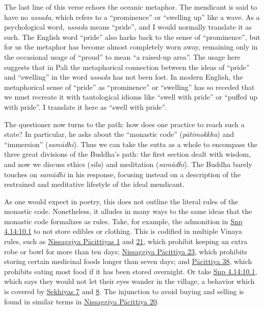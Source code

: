 \documentclass[12pt,openany]{book}%
\begin{document}
The last line of this verse echoes the oceanic metaphor. The mendicant is said to have no \textit{ussada}, which refers to a “prominence” or “swelling up” like a wave. As a psychological word, \textit{ussada} means “pride”, and I would normally translate it as such. The English word “pride” also harks back to the sense of “prominence”, but for us the metaphor has become almost completely worn away, remaining only in the occasional usage of “proud” to mean “a raised-up area”. The usage here suggests that in Pali the metaphorical connection between the ideas of “pride” and “swelling” in the word \textit{ussada} has not been lost. In modern English, the metaphorical sense of “pride” as “prominence” or “swelling” has so receded that we must recreate it with tautological idioms like “swell with pride” or “puffed up with pride”. I translate it here as “swell with pride”.

The questioner now turns to the path: how does one practice to reach such a state? In particular, he asks about the “monastic code” (\textit{\textsanskrit{pātimokkha}}) and “immersion” (\textit{\textsanskrit{samādhi}}). Thus we can take the sutta as a whole to encompass the three great divisions of the Buddha’s path: the first section dealt with wisdom, and now we discuss ethics (\textit{\textsanskrit{sīla}}) and meditation (\textit{\textsanskrit{samādhi}}). The Buddha barely touches on \textit{\textsanskrit{samādhi}} in his response, focusing instead on a description of the restrained and meditative lifestyle of the ideal mendicant.

As one would expect in poetry, this does not outline the literal rules of the monastic code. Nonetheless, it alludes in many ways to the same ideas that the monastic code formalizes as rules. Take, for example, the admonition in \href{https://suttacentral.net/snp4.14/en/sujato\#10.1}{Snp 4.14:10.1} to not store edibles or clothing. This is codified in multiple Vinaya rules, such as \href{https://suttacentral.net/pli-tv-bu-vb-np1/en/brahmali}{Nissaggiya Pācittiyas 1} and \href{https://suttacentral.net/pli-tv-bu-vb-np21/en/brahmali}{21}, which prohibit keeping an extra robe or bowl for more than ten days; \href{https://suttacentral.net/pli-tv-bu-vb-np23/en/brahmali}{Nissaggiya Pācittiya 23}, which prohibits storing certain medicinal foods longer than seven days; and \href{https://suttacentral.net/pli-tv-bu-vb-pc38/en/brahmali}{Pācittiya 38}, which prohibits eating most food if it has been stored overnight. Or take \href{https://suttacentral.net/snp4.14/en/sujato\#10.1}{Snp 4.14:10.1}, which says they would not let their eyes wander in the village, a behavior which is covered by \href{https://suttacentral.net/pli-tv-bu-vb-sk7/en/brahmali}{Sekhiyas 7} and \href{https://suttacentral.net/pli-tv-bu-vb-sk8/en/brahmali}{8}. The injunction to avoid buying and selling is found in similar terms in \href{https://suttacentral.net/pli-tv-bu-vb-np20/en/brahmali}{Nissaggiya Pācittiya 20}.
\end{document}
